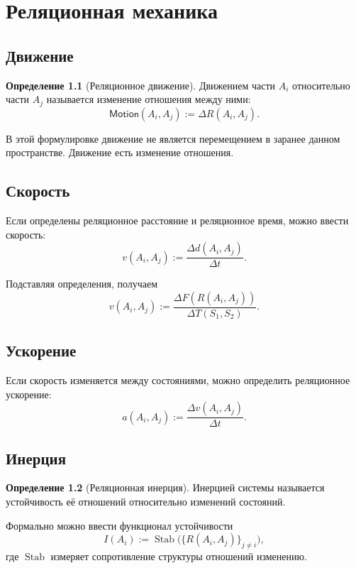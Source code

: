 \documentclass[12pt,a4paper,oneside]{book}
\theoremstyle{definition}
\newtheorem{definition}{Определение}[chapter]
\theoremstyle{plain}
\theoremstyle{remark}
\newcommand{\Rel}{R}
\newcommand{\State}{S}
\newcommand{\Motion}{\mathsf{Motion}}
\begin{document}
\chapter{Реляционная механика}

\section{Движение}

\begin{definition}[Реляционное движение]
Движением части \(A_i\) относительно части \(A_j\) называется изменение отношения между ними:
\[
\Motion(A_i,A_j):=\Delta\Rel(A_i,A_j).
\]
\end{definition}

В этой формулировке движение не является перемещением в заранее данном пространстве. Движение есть изменение отношения.

\section{Скорость}

Если определены реляционное расстояние и реляционное время, можно ввести скорость:
\[
v(A_i,A_j):=\frac{\Delta d(A_i,A_j)}{\Delta t}.
\]

Подставляя определения, получаем
\[
v(A_i,A_j):=
\frac{\Delta F(\Rel(A_i,A_j))}
{\Delta T(\State_1,\State_2)}.
\]

\section{Ускорение}

Если скорость изменяется между состояниями, можно определить реляционное ускорение:
\[
a(A_i,A_j):=\frac{\Delta v(A_i,A_j)}{\Delta t}.
\]

\section{Инерция}

\begin{definition}[Реляционная инерция]
Инерцией системы называется устойчивость её отношений относительно изменений состояний.
\end{definition}

Формально можно ввести функционал устойчивости
\[
I(A_i):=\operatorname{Stab}\bigl(\{\Rel(A_i,A_j)\}_{j\neq i}\bigr),
\]
где \(\operatorname{Stab}\) измеряет сопротивление структуры отношений изменению.
\end{document}
